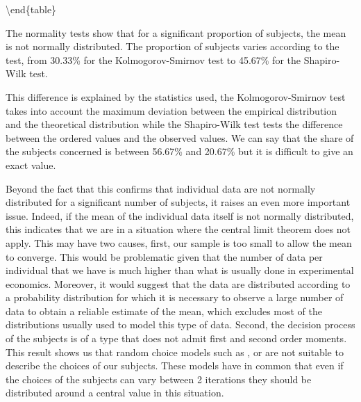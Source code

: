 \documentclass[
]{book}
\begin{document}
\textbackslash end\{table\}

The normality tests show that for a significant proportion of subjects,
the mean is not normally distributed. The proportion of subjects varies
according to the test, from 30.33\%
for the Kolmogorov-Smirnov test to
45.67\% for the Shapiro-Wilk test.

This difference is explained by the statistics used, the
Kolmogorov-Smirnov test takes into account the maximum deviation between
the empirical distribution and the theoretical distribution while the
Shapiro-Wilk test tests the difference between the ordered values and
the observed values. We can say that the share of the subjects concerned
is between 56.67\% and
20.67\% but it is difficult to
give an exact value.

Beyond the fact that this confirms that individual data are not normally
distributed for a significant number of subjects, it raises an even more
important issue. Indeed, if the mean of the individual data itself is
not normally distributed, this indicates that we are in a situation
where the central limit theorem does not apply. This may have two
causes, first, our sample is too small to allow the mean to converge.
This would be problematic given that the number of data per individual
that we have is much higher than what is usually done in experimental
economics. Moreover, it would suggest that the data are distributed
according to a probability distribution for which it is necessary to
observe a large number of data to obtain a reliable estimate of the
mean, which excludes most of the distributions usually used to model
this type of data. Second, the decision process of the subjects is of a
type that does not admit first and second order moments.
This result shows us that random choice models such as \citet{gul2006random},
\citet{gul2014random} or \citet{cerreia2019deliberately} are not suitable to describe the
choices of our subjects.
These models have in common that even if the choices of the subjects can vary
between 2 iterations they should be distributed around a central value in this
situation.
\end{document}
